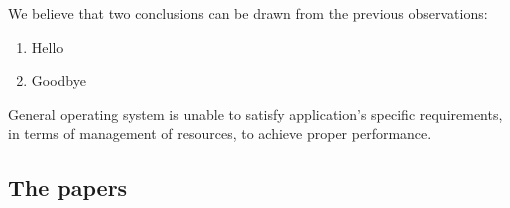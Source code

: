 We believe that two conclusions can be drawn from the previous observations:
\begin{enumerate}
	\item Hello 
	\item Goodbye
\end{enumerate}
General operating system is unable to satisfy application's specific requirements, in terms of management of resources, to achieve proper performance.

\subsection{The papers}
 
